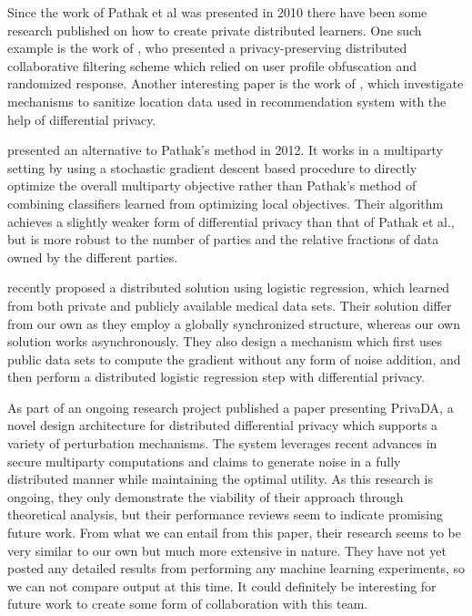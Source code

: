Since the work of Pathak et al was presented in 2010 there have been some research published on how to create private distributed learners. One such example is the work of \cite{boutet2013DisCollFil}, who presented a privacy-preserving distributed collaborative filtering scheme which relied on user profile obfuscation and randomized response. Another interesting paper is the work of \cite{zhang2014locationRecommendation}, which investigate mechanisms to sanitize location data used in recommendation system with the help of differential privacy. 

\cite{rajkumar2012differentially} presented an alternative to Pathak's method in 2012. It works in a multiparty setting by using a stochastic gradient descent based procedure to directly optimize the overall multiparty objective rather than Pathak's method of combining classifiers learned from optimizing local objectives. Their algorithm achieves a slightly weaker form of differential privacy than that of Pathak et al., but is more robust to the number of parties and the relative fractions of data owned by the different parties.

\cite{ji2014DisLogReg} recently proposed a distributed solution using logistic regression, which learned from both private and publicly available medical data sets. Their solution differ from our own as they employ a globally synchronized structure, whereas our own solution works asynchronously. They also design a mechanism which first uses public data sets to compute the gradient without any form of noise addition, and then perform a distributed logistic regression step with differential privacy. 

As part of an ongoing research project \cite{eigner2014privada} published a paper presenting PrivaDA, a novel design architecture for distributed differential privacy which supports a variety of perturbation mechanisms. The system leverages recent advances in secure multiparty computations and claims to generate noise in a fully distributed manner while maintaining the optimal utility. As this research is ongoing, they only demonstrate the viability of their approach through theoretical analysis, but their performance reviews seem to indicate promising future work. From what we can entail from this paper, their research seems to be very similar to our own but much more extensive in nature. They have not yet posted any detailed results from performing any machine learning experiments, so we can not compare output at this time. It could definitely be interesting for future work to create some form of collaboration with this team. 


